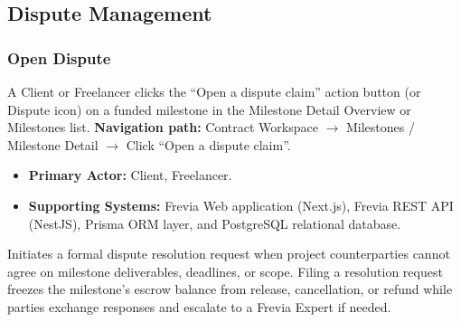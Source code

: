 
\subsection{Dispute Management}

\subsubsection{ Open Dispute}

A Client or Freelancer clicks the ``Open a dispute claim'' action button (or Dispute icon) on a funded milestone in the Milestone Detail Overview or Milestones list.\newline
\textbf{Navigation path:} Contract Workspace $\rightarrow$ Milestones / Milestone Detail $\rightarrow$ Click ``Open a dispute claim''.


\begin{itemize}[leftmargin=1.6em,topsep=3pt,itemsep=2pt,parsep=0pt,label=$\bullet$]
      \item \textbf{Primary Actor:} Client, Freelancer.
      \item \textbf{Supporting Systems:} Frevia Web application (Next.js), Frevia REST API (NestJS), Prisma ORM layer, and PostgreSQL relational database.
\end{itemize}

\noindent Initiates a formal dispute resolution request when project counterparties cannot agree on milestone deliverables, deadlines, or scope. Filing a resolution request freezes the milestone's escrow balance from release, cancellation, or refund while parties exchange responses and escalate to a Frevia Expert if needed.

